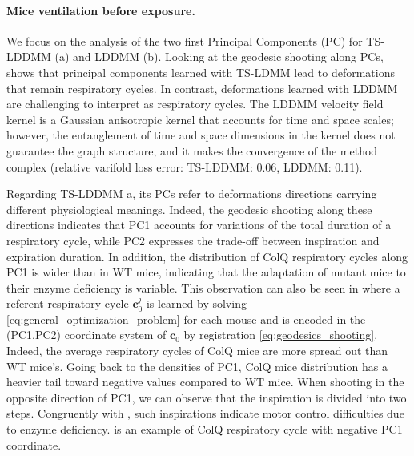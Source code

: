 \paragraph{Mice ventilation before exposure.}
We focus on the analysis of the two first Principal Components (PC) for TS-LDDMM (a) and LDDMM (b). Looking at the geodesic shooting along PCs,  shows that principal components learned with TS-LDMM lead to deformations that remain respiratory cycles. In contrast, deformations learned with LDDMM are challenging to interpret as respiratory cycles. The LDDMM velocity field kernel is a Gaussian anisotropic kernel that accounts for time and space scales; however, the entanglement of time and space dimensions in the kernel does not guarantee the graph structure, and it makes the convergence of the method complex (relative varifold loss error: TS-LDDMM: 0.06, LDDMM: 0.11).

Regarding TS-LDDMM a, its PCs refer to deformations directions carrying different physiological meanings. Indeed, the geodesic shooting along these directions indicates that PC1 accounts for variations of the total duration of a respiratory cycle, while PC2 expresses the trade-off between inspiration and expiration duration. In addition, the distribution of ColQ respiratory cycles along PC1 is wider than in WT mice, indicating that the adaptation of mutant mice to their enzyme deficiency is variable. This observation can also be seen in  where a referent respiratory cycle $\mathbf{c}_0^j$ is learned by solving \eqref{eq:general_optimization_problem} for each mouse and is encoded in the (PC1,PC2) coordinate system of $\mathbf{c}_0$ by registration \eqref{eq:geodesics_shooting}. Indeed, the average respiratory cycles of ColQ mice are more spread out than WT mice's. Going back to the densities of PC1, ColQ mice distribution has a heavier tail toward negative values compared to WT mice. When shooting in the opposite direction of PC1, we can observe that the inspiration is divided into two steps. Congruently with \cite{germain2023unsupervised}, such inspirations indicate motor control difficulties due to enzyme deficiency.  is an example of ColQ respiratory cycle with negative PC1 coordinate.


